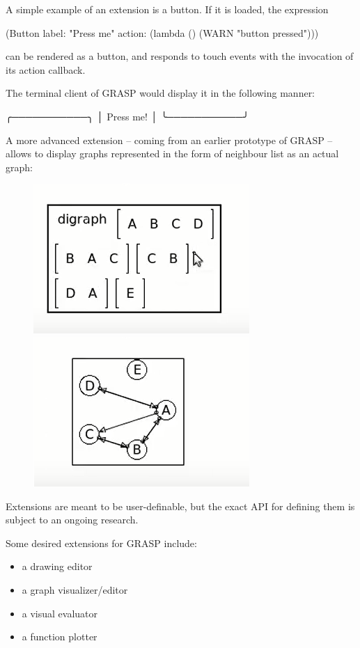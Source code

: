 \documentclass[sigconf]{acmart}
\newenvironment{Snippet}{\Verbatim[samepage=true]}{\endVerbatim}
\begin{document}
A simple example of an extension is a button.
If it is loaded, the expression

\begin{Snippet}
(Button label: "Press me" 
	action: (lambda () (WARN "button pressed")))
\end{Snippet}

can be rendered as a button, and responds
to touch events with the invocation of its
action callback.

The terminal client of GRASP would display
it in the following manner:

\begin{Snippet}
╭───────────╮
│ Press me! │
╰───────────╯
\end{Snippet}

A more advanced extension -- coming from an earlier
prototype of GRASP -- allows to display graphs represented
in the form of neighbour list as an actual graph:

\begin{figure}[H]
  \centering%
  \includegraphics[width=.45\linewidth,frame]{digraph-1}\hfill%
  \includegraphics[width=.45\linewidth,frame]{digraph-2}\hfill%
\end{figure}

Extensions are meant to be user-definable, but
the exact API for defining them is subject to
an ongoing research.

Some desired extensions for GRASP include:
\begin{itemize}
\item a drawing editor
\item a graph visualizer/editor
\item a visual evaluator
\item a function plotter
\end{itemize}
\end{document}
